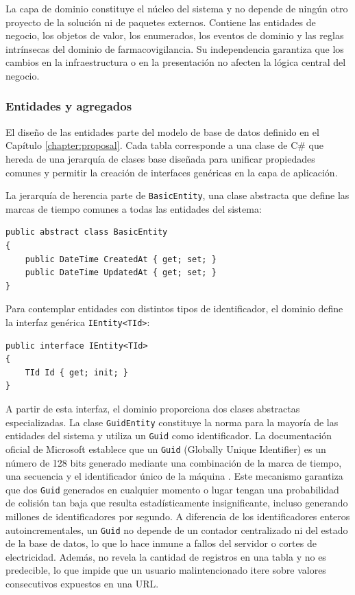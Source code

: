 La capa de dominio constituye el núcleo del sistema y no depende de ningún otro proyecto de la solución ni de paquetes externos. 
Contiene las entidades de negocio, los objetos de valor, los enumerados, los eventos de dominio y las reglas intrínsecas del dominio de farmacovigilancia. 
Su independencia garantiza que los cambios en la infraestructura o en la presentación no afecten la lógica central del negocio.

\subsubsection{Entidades y agregados}

El diseño de las entidades parte del modelo de base de datos definido en el Capítulo \ref{chapter:proposal}. 
Cada tabla corresponde a una clase de C\# que hereda de una jerarquía de clases base diseñada para unificar propiedades comunes y permitir la creación de interfaces genéricas en la capa de aplicación.

La jerarquía de herencia parte de \texttt{BasicEntity}, una clase abstracta que define las marcas de tiempo comunes a todas las entidades del sistema:

\begin{lstlisting}[language={[Sharp]C}, caption={Clase base BasicEntity con marcas de tiempo}, label={lst:basicentity}]
public abstract class BasicEntity
{
    public DateTime CreatedAt { get; set; }
    public DateTime UpdatedAt { get; set; }
}
\end{lstlisting}

Para contemplar entidades con distintos tipos de identificador, el dominio define la interfaz genérica \texttt{IEntity<TId>}:

\begin{lstlisting}[language={[Sharp]C}, caption={Interfaz genérica para identificadores de entidad}, label={lst:ientity}]
public interface IEntity<TId>
{
    TId Id { get; init; }
}
\end{lstlisting}

A partir de esta interfaz, el dominio proporciona dos clases abstractas especializadas. La clase \texttt{GuidEntity} constituye la norma para la mayoría de las entidades del sistema y utiliza un \texttt{Guid} como identificador. La documentación oficial de Microsoft establece que un \texttt{Guid} (Globally Unique Identifier) es un número de 128 bits generado mediante una combinación de la marca de tiempo, una secuencia y el identificador único de la máquina \cite{microsoft_guid}. 
Este mecanismo garantiza que dos \texttt{Guid} generados en cualquier momento o lugar tengan una probabilidad de colisión tan baja que resulta estadísticamente insignificante, incluso generando millones de identificadores por segundo. 
A diferencia de los identificadores enteros autoincrementales, un \texttt{Guid} no depende de un contador centralizado ni del estado de la base de datos, lo que lo hace inmune a fallos del servidor o cortes de electricidad. Además, no revela la cantidad de registros en una tabla y no es predecible, lo que impide que un usuario malintencionado itere sobre valores consecutivos expuestos en una URL.

